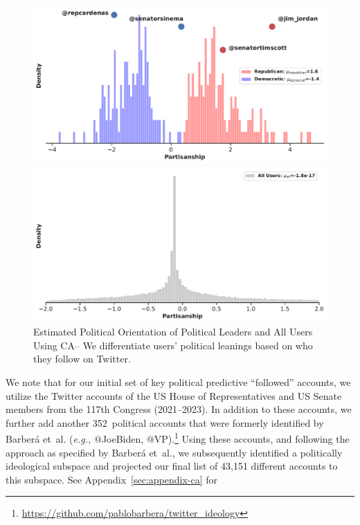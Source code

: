 \begin{figure}
\begin{minipage}[l]{0.47\textwidth}
\includegraphics[width=1\columnwidth]{figures/partisanship_us_members-20240424.pdf} 
\end{minipage}
\begin{minipage}[l]{0.47\textwidth}
\includegraphics[width=1\columnwidth]{figures/partisanship_all_users-20240424.pdf} 
\end{minipage}

\begin{minipage}[l]{1\textwidth}
\caption{{Estimated Political Orientation of Political Leaders and All Users Using CA}-- We differentiate users' political leanings based on who they follow on Twitter.\label{fig:politican-orientation}}
\end{minipage}

\end{figure}
We note that for our initial set of key political predictive ``followed'' accounts,  we utilize the Twitter accounts of the US House of Representatives and US Senate members from the 117th Congress (2021--2023). In addition to these accounts, we further add another 352~political accounts that were formerly identified by Barber{\'a} {et~al.} (\textit{e.g.,} $@$JoeBiden, $@$VP).\footnote{\url{https://github.com/pablobarbera/twitter_ideology}} Using these accounts, and following the approach as specified by  Barber{\'a}  {et~al.}, we subsequently identified a politically ideological subspace and projected our final list of 43,151 different accounts to this subspace. See Appendix~\ref{sec:appendix-ca} for 

